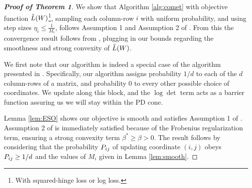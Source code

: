 \documentclass{article}
\begin{document}
\begin{proof}[\bf{Proof of Theorem 1}]
We show that Algorithm \ref{alg:comet} with objective function $\tilde{L}({W})$\footnote{With squared-hinge loss or log loss.}, sampling each column-row $i$ with uniform probability, and using step sizes $\eta_i \leq \frac{1}{M_i}$, follows Assumption 1 and Assumption 2 of \citet{richtarik2013optimal}. From this the convergence result follows from \citeauthor[Theorem 3]{richtarik2013optimal}, plugging in our bounds regarding the smoothness and strong convexity of $\tilde{L}({W})$.

We first note that our algorithm is indeed a special case of the algorithm presented in \citet{richtarik2013optimal}. Specifically, our algorithm assigns probability $1/d$ to each of the $d$ column-rows of a matrix, and probability $0$ to every other possible choice of coordinates. We update along this block, and the $\log \det$ term acts as a barrier function
assuring us we will stay within the PD cone.

Lemma \ref{lem:ESO} shows our objective is smooth and satisfies Assumption 1 of \citeauthor{richtarik2013optimal}. Assumption 2 of \citeauthor{richtarik2013optimal} is immediately satisfied because of the Frobenius regularization term, ensuring a strong convexity term  $\beta^* \geq \beta > 0$. The result follows by considering that the probability ${P}_{ij}$ of updating coordinate $(i,j)$ obeys ${P}_{ij} \geq 1/d$ and the values of $M_i$ given in Lemma \ref{lem:smooth}.

\end{proof}

\newpage


\end{document}
